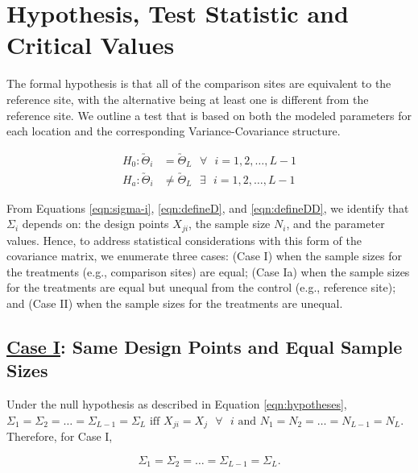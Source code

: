 \documentclass[useAMS]{cJAS2e}
\newcommand{\undertilde}[1]{\utilde{#1}}
\begin{document}
\section{Hypothesis, Test Statistic and Critical Values}\label{sec:mc-control}

The formal hypothesis is that all of the comparison sites are equivalent to the reference site, with the alternative being at least one is different from the reference site.  We outline a test that is based on both the modeled parameters for each location and the corresponding Variance-Covariance structure.

\begin{equation}\label{eqn:hypotheses}
	\begin{split}
	H_0: \undertilde{\Theta}_i 		&=	\undertilde{\Theta}_L	\mbox{   } \forall \mbox{ } i = 1, 2, \ldots, L-1	\\
	H_a: \undertilde{\Theta}_i		&\neq	\undertilde{\Theta}_L	\mbox{   } \exists \mbox{ } i = 1, 2, \ldots, L-1
	\end{split}
\end{equation}

From Equations \eqref{eqn:sigma-i}, \eqref{eqn:defineD}, and \eqref{eqn:defineDD}, we identify that $\Sigma_i$ depends on: the design points $X_{ji}$, the sample size $N_i$, and the parameter values.  Hence, to address statistical considerations with this form of the covariance matrix, we enumerate three cases:  (Case I) when the sample sizes for the treatments (e.g., comparison sites) are equal; (Case Ia) when the sample sizes for the treatments are equal but unequal from the control (e.g., reference site); and (Case II) when the sample sizes for the treatments are unequal.

\subsection*{\underline{Case I}: Same Design Points and Equal Sample Sizes}

Under the null hypothesis as described in Equation \eqref{eqn:hypotheses}, $\Sigma_1 = \Sigma_2 = \ldots = \Sigma_{L-1} = \Sigma_L \text{ iff } X_{ji}=X_j \text{ \  } \forall \text{ \  } i \text{ and } N_1 = N_2 = \ldots = N_{L-1} = N_L$.  Therefore, for Case I,

\begin{equation}\label{eqn:case-i-sigma}
	\Sigma_1 = \Sigma_2 = \ldots = \Sigma_{L-1} = \Sigma_L .
\end{equation}
\end{document}
